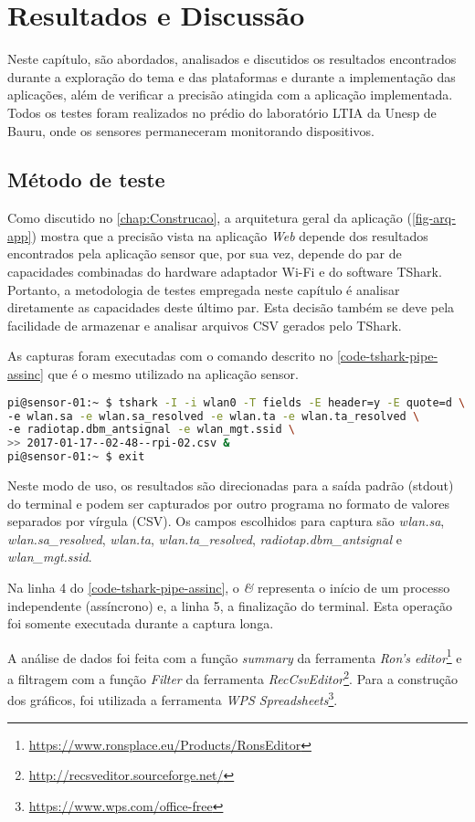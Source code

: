 \chapter{Resultados e Discussão}
\label{chap:resultados}

Neste capítulo, são abordados, analisados e discutidos os resultados encontrados
durante a exploração do tema e das plataformas e durante a implementação das
aplicações, além de verificar a precisão atingida com a aplicação implementada. Todos os testes foram realizados no prédio do laboratório
LTIA da Unesp de Bauru, onde os sensores permaneceram monitorando dispositivos.



\section{Método de teste}
\label{sec:metodo-teste}

Como discutido no \autoref{chap:Construcao}, a arquitetura geral da aplicação (\autoref{fig-arq-app})
mostra que a precisão vista na aplicação \emph{Web} depende dos resultados
encontrados pela aplicação sensor que, por sua vez, depende do par de
capacidades combinadas do hardware adaptador Wi-Fi e do software
TShark. Portanto, a metodologia de testes empregada neste capítulo é
analisar diretamente as capacidades deste último par. Esta decisão também se
deve pela facilidade de armazenar e analisar arquivos CSV gerados pelo
TShark.

As capturas foram executadas com o comando descrito no \autoref{code-tshark-pipe-assinc}
que é o mesmo utilizado na aplicação sensor.

\begin{lstlisting}[language=bash,caption={TShark e redirecionamento da saída para arquivo assíncrono},label=code-tshark-pipe-assinc]
pi@sensor-01:~ $ tshark -I -i wlan0 -T fields -E header=y -E quote=d \
-e wlan.sa -e wlan.sa_resolved -e wlan.ta -e wlan.ta_resolved \
-e radiotap.dbm_antsignal -e wlan_mgt.ssid \
>> 2017-01-17--02-48--rpi-02.csv &
pi@sensor-01:~ $ exit
\end{lstlisting}

Neste modo de uso, os resultados são direcionadas para a saída padrão
(stdout)  do terminal e podem ser capturados por outro programa no formato
de valores separados por vírgula (CSV). Os campos escolhidos para captura
são \emph{wlan.sa}, \emph{wlan.sa\_resolved}, \emph{wlan.ta},
\emph{wlan.ta\_resolved}, \emph{radiotap.dbm\_antsignal} e \emph{wlan\_mgt.ssid}.

Na linha 4 do \autoref{code-tshark-pipe-assinc}, o \emph{\&} representa o início
de um processo independente (assíncrono) e, a linha 5, a finalização do terminal.
Esta operação foi somente executada durante a captura longa.

A análise de dados foi feita com a função \emph{summary} da ferramenta
\emph{Ron’s editor}\footnote{\url{https://www.ronsplace.eu/Products/RonsEditor}}
e a filtragem com a função \emph{Filter} da ferramenta
\emph{RecCsvEditor}\footnote{\url{http://recsveditor.sourceforge.net/}}. Para a
construção dos gráficos, foi utilizada a ferramenta
\emph{WPS Spreadsheets}\footnote{\url{https://www.wps.com/office-free}}.
